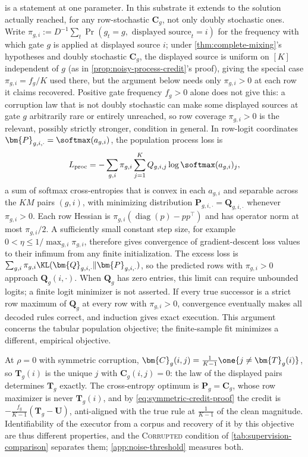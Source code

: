  is a statement at one parameter.  In this
substrate it extends to the solution actually reached, for any
row-stochastic $\bm{C}_g$, not only doubly stochastic ones. Write
$\pi_{g,i}:=D^{-1}\sum_t\Pr(g_t=g,\text{ displayed source}_{t}=i)$ for the
frequency with which gate $g$ is applied at displayed source $i$; under
\cref{thm:complete-mixing}'s hypotheses and doubly stochastic $\bm{C}_g$, the
displayed source is uniform on $[K]$ independent of $g$ (as in
\cref{prop:noisy-process-credit}'s proof), giving the special case
$\pi_{g,i}=f_g/K$ used there, but the argument below needs only
$\pi_{g,i}>0$ at each row it claims recovered. Positive gate frequency
$f_g>0$ alone does not give this: a corruption law that is not doubly
stochastic can make some displayed sources at gate $g$ arbitrarily rare
or entirely unreached, so row coverage $\pi_{g,i}>0$ is the relevant,
possibly strictly stronger, condition in general. In row-logit
coordinates $\bm{P}_{g,i,\cdot}=\softmax(a_{g,i})$, the population process loss is
\[
 L_{\rm proc}
 =-\sum_{g,i}\pi_{g,i}\sum_{j=1}^{K}
   Q_{g,i,j}\log\softmax(a_{g,i})_j ,
\]
a sum of softmax cross-entropies that is convex in each $a_{g,i}$ and separable
across the $KM$ pairs $(g,i)$, with minimizing distribution
$\bm{P}_{g,i,\cdot}=\bm{Q}_{g,i,\cdot}$ whenever $\pi_{g,i}>0$. Each row Hessian is
$\pi_{g,i}(\operatorname{diag}(p)-pp^\top)$ and has operator norm at most
$\pi_{g,i}/2$. A sufficiently small constant step size, for example
$0<\eta\le1/\max_{g,i}\pi_{g,i}$, therefore gives convergence of gradient-descent
loss values to their infimum from any finite initialization. The excess loss
is $\sum_{g,i}\pi_{g,i}\KL(\bm{Q}_{g,i,\cdot}\|\bm{P}_{g,i,\cdot})$, so the predicted
rows with $\pi_{g,i}>0$ approach $\bm{Q}_g(i,\cdot)$. When $\bm{Q}_g$ has zero entries, this limit can require
unbounded logits; a finite logit minimizer is not asserted. If every true
successor is a strict row maximum of $\bm{Q}_g$ at every row with $\pi_{g,i}>0$, convergence eventually makes
all decoded rules correct, and induction gives exact execution. This argument
concerns the tabular population objective; the finite-sample fit minimizes a
different, empirical objective.

At $\rho=0$ with symmetric corruption, $\bm{C}_g(i,j)=\frac{1}{K-1}
\one\{j\ne \bm{T}_g(i)\}$, so $\bm{T}_g(i)$ is the unique $j$ with $\bm{C}_g(i,j)=0$: the law
of the displayed pairs determines $\bm{T}_g$ exactly.  The cross-entropy optimum is
$\bm{P}_g=\bm{C}_g$, whose row maximizer is never $\bm{T}_g(i)$, and by
\cref{eq:symmetric-credit-proof} the credit is $-\frac{f_g}{K-1}(\bm{T}_g-\bm{U})$, anti-aligned
with the true rule at $\frac{1}{K-1}$ of the clean magnitude.  Identifiability
of the executor from a corpus and recovery of it by this objective are thus
different properties, and the \textsc{Corrupted} condition of
\cref{tab:supervision-comparison} separates them;
\cref{app:noise-threshold} measures both.

